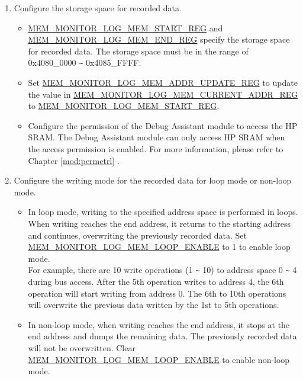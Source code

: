 \documentclass[main\_\_EN.tex]{subfiles}
\begin{document}
\begin{enumerate}
\begin{itemize}
        \end{itemize}
    \item Configure the storage space for recorded data.
        \begin{itemize}
            \item \hyperref[regdesc:MEMMONITORLOGMEMSTARTREG]{MEM\_MONITOR\_LOG\_MEM\_START\_REG} and \hyperref[regdesc:MEMMONITORLOGMEMENDREG]{MEM\_MONITOR\_LOG\_MEM\_END\_REG} specify the storage space for recorded data. The storage space must be in the range of 0x4080\_0000 \verb+~+ 0x4085\_FFFF.
            \item Set \hyperref[regdesc:MEMMONITORLOGMEMADDRUPDATEREG]{MEM\_MONITOR\_LOG\_MEM\_ADDR\_UPDATE\_REG} to update the value in \hyperref[regdesc:MEMMONITORLOGMEMCURRENTADDRREG]{MEM\_MONITOR\_LOG\_MEM\_CURRENT\_ADDR\_REG} to \hyperref[regdesc:MEMMONITORLOGMEMSTARTREG]{MEM\_MONITOR\_LOG\_MEM\_START\_REG}.
            \item Configure the permission of the Debug Assistant module to access the HP SRAM. The Debug Assistant module can only access HP SRAM when the access permission is enabled. For more information, please refer to Chapter \ref{mod:permctrl} \textit{}.
        \end{itemize}
    \item \label{other:dbgassist-item-log-config-step5} Configure the writing mode for the recorded data for loop mode or non-loop mode.
        \begin{itemize}
            \item In loop mode, writing to the specified address space is performed in loops. When writing reaches the end address, it returns to the starting address and continues, overwriting the previously recorded data. Set \hyperref[fielddesc:MEMMONITORLOGMEMLOOPENABLE]{MEM\_MONITOR\_LOG\_MEM\_LOOP\_ENABLE} to 1 to enable loop mode.\\
            For example, there are 10 write operations (1 \verb+~+ 10) to address space 0 \verb+~+ 4 during bus access. After the 5th operation writes to address 4, the 6th operation will start writing from address 0. The 6th to 10th operations will overwrite the previous data written by the 1st to 5th operations.
            \item In non-loop mode, when writing reaches the end address, it stops at the end address and dumps the remaining data. The previously recorded data will not be overwritten. Clear \hyperref[fielddesc:MEMMONITORLOGMEMLOOPENABLE]{MEM\_MONITOR\_LOG\_MEM\_LOOP\_ENABLE} to enable non-loop mode.\\

\end{itemize}
\end{enumerate}
\end{document}
